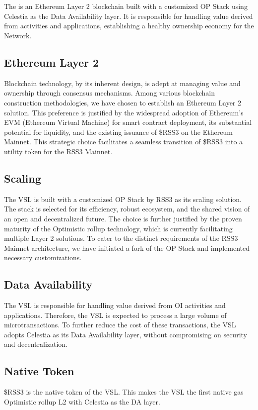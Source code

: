 \section{}
\label{sec:VSL}

The  is an Ethereum Layer 2 blockchain built with a customized OP Stack \cite{op-fork} using Celestia \cite{celestia} as the Data Availability layer.
It is responsible for handling value derived from  activities and applications, establishing a healthy ownership economy for the Network.

\subsection{Ethereum Layer 2}

Blockchain technology, by its inherent design, is adept at managing value and ownership through consensus mechanisms.
Among various blockchain construction methodologies, we have chosen to establish an Ethereum Layer 2 solution.
This preference is justified by the widespread adoption of Ethereum's EVM (Ethereum Virtual Machine) for smart contract deployment, its substantial potential for liquidity, and the existing issuance of \$RSS3 on the Ethereum Mainnet. 
This strategic choice facilitates a seamless transition of \$RSS3 into a utility token for the RSS3 Mainnet.

\subsection{Scaling}
The \gls{VSL} is built with a customized OP Stack by RSS3 as its scaling solution.
The stack is selected for its efficiency, robust ecosystem, and the shared vision of an open and decentralized future.
The choice is further justified by the proven maturity of the Optimistic rollup technology, which is currently facilitating multiple Layer 2 solutions.
To cater to the distinct requirements of the RSS3 Mainnet architecture, we have initiated a fork of the OP Stack and implemented necessary customizations.

\subsection{Data Availability}

The \gls{VSL} is responsible for handling value derived from \gls{OI} activities and applications.
Therefore, the \gls{VSL} is expected to process a large volume of microtransactions.
To further reduce the cost of these transactions, the \gls{VSL} adopts Celestia as its Data Availability layer, without compromising on security and decentralization.

\subsection{Native Token}

\$RSS3 is the native token of the \gls{VSL}.
This makes the \gls{VSL} the first native gas Optimistic rollup L2 with Celestia as the DA layer.